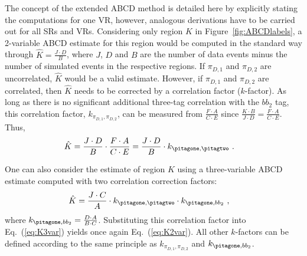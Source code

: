 The concept of the extended ABCD method is detailed here by explicitly stating the computations for one VR, however, analogous derivations have to be carried out for all SRs and VRs. Considering only region $K$ in Figure~\ref{fig:ABCDlabels}, a 2-variable ABCD estimate for this region would be computed in the standard way through $\hat{K} = \frac{J\cdot D}{B}$, where $J$, $D$ and $B$ are the number of data events minus the number of simulated events in the respective regions. If $\pi_{D,1}$ and $\pi_{D,2}$ are uncorrelated, $\hat{K}$ would be a valid estimate. However, if $\pi_{D,1}$ and $\pi_{D,2}$ are correlated, then $\hat{K}$ needs to be corrected by a correlation factor ($k$-factor). As long as there is no significant additional three-tag correlation with the $bb_2$ tag, this correlation factor, $k_{\pi_{D,1},\pi_{D,2}}$, can be measured from $\frac{F\cdot A}{C\cdot E}$ since $\frac{K\cdot B}{J\cdot D}=\frac{F\cdot A}{C\cdot E}$. Thus,
\begin{align}
  \hat{K} &= \frac{J\cdot D}{B} \cdot \frac{F\cdot A}{C\cdot E} = \frac{J\cdot D}{B} \cdot k_{\pitagone,\pitagtwo}~.
\label{eq:K2var}
\end{align}

One can also consider the estimate of region $K$ using a three-variable ABCD estimate computed with two correlation correction factors:
\begin{align}
  \hat{K} &= \frac{J\cdot C}{A} \cdot k_{\pitagone,\pitagtwo} \cdot k_{\pitagone,bb_2}~,
\label{eq:K3var}
\end{align}
where $k_{\pitagone,bb_2}=\frac{D\cdot A}{B\cdot C}$. 
Substituting this correlation factor into Eq.~(\ref{eq:K3var}) yields once again Eq.~(\ref{eq:K2var}).
All other $k$-factors can be defined according to the same principle as $k_{\pi_{D,1},\pi_{D,2}}$ and $k_{\pitagone,bb_2}$.

